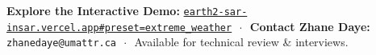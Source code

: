 \documentclass[10pt,letterpaper]{article}
\begin{document}
\vspace{-2pt}

\begin{tcolorbox}[colframe=tomorrowblue,colback=tomorrowblue,coltext=white,boxrule=0pt,top=4pt,bottom=4pt]
\centering\footnotesize
\textbf{Explore the Interactive Demo:} \href{https://earth2-sar-insar.vercel.app#preset=extreme_weather&stage=v3}{\texttt{earth2-sar-insar.vercel.app\#preset=extreme\_weather}} $\,\cdot\,$ 
\textbf{Contact Zhane Daye:} \texttt{zhanedaye@umattr.ca} $\,\cdot\,$ Available for technical review \& interviews.
\end{tcolorbox}
\end{document}
